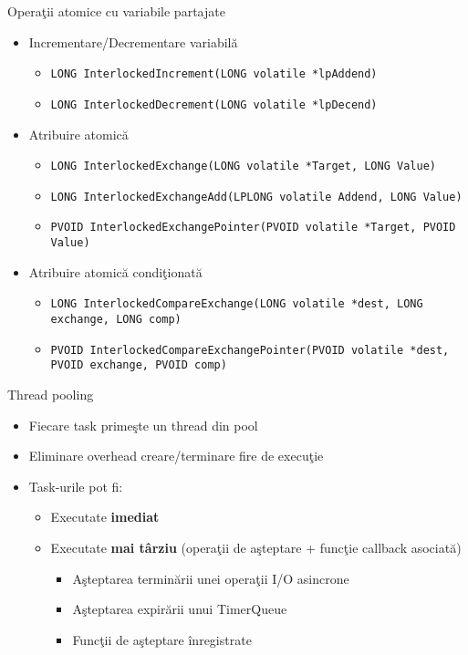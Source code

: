 \documentclass{so.cs.pub.ro}
\begin{document}
\begin{frame}{Operaţii atomice cu variabile partajate}
	\begin{itemize}
		\item Incrementare/Decrementare variabilă
			\begin{itemize}
				\item \texttt{LONG InterlockedIncrement(LONG volatile *lpAddend)}
				\item \texttt{LONG InterlockedDecrement(LONG volatile *lpDecend)}
			\end{itemize}
		\item Atribuire atomică
			\begin{itemize}
				\item \texttt{LONG InterlockedExchange(LONG volatile *Target, LONG Value)}
				\item \texttt{LONG InterlockedExchangeAdd(LPLONG volatile Addend, LONG Value)}
				\item \texttt{PVOID InterlockedExchangePointer(PVOID volatile *Target, PVOID Value)}
			\end{itemize}
		\item Atribuire atomică condiţionată
			\begin{itemize}
				\item \texttt{LONG InterlockedCompareExchange(LONG volatile *dest, LONG exchange, LONG comp)}
				\item \texttt{PVOID InterlockedCompareExchangePointer(PVOID volatile *dest, PVOID exchange, PVOID comp)}
			\end{itemize}
	\end{itemize}
\end{frame}

\begin{frame}{Thread pooling}
	\begin{itemize}
		\item Fiecare task primeşte un thread din pool
		\item Eliminare overhead creare/terminare fire de execuţie
		\item Task-urile pot fi:
			\begin{itemize}
				\item Executate \textbf{imediat}
				\item Executate \textbf{mai târziu} (operaţii de aşteptare + funcţie callback asociată)
					\begin{itemize}
						\item Aşteptarea terminării unei operaţii I/O asincrone
						\item Aşteptarea expirării unui TimerQueue
						\item Funcţii de aşteptare înregistrate
					\end{itemize}
			\end{itemize}
	\end{itemize}
\end{frame}

\end{document}
